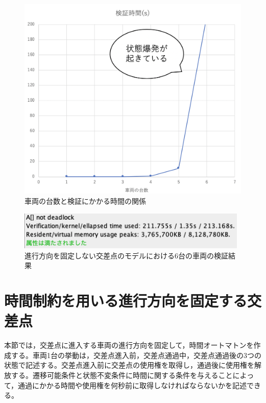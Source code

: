 \documentclass{tpu-sotu}
\begin{document}
	\begin{figure}[htbp]
	\centering
	\includegraphics[width=120mm]{IntersectionVerificationTime.png}
	\caption{車両の台数と検証にかかる時間の関係}
	\label{IVT}
	\end{figure}

	\begin{figure}[htbp]
	\centering
	\includegraphics[width=110mm]{InterBigCar6.png}
	\caption{進行方向を固定しない交差点のモデルにおける6台の車両の検証結果}
	\label{IBC6}
	\end{figure}

	
	\section{時間制約を用いる進行方向を固定する交差点}
	本節では，交差点に進入する車両の進行方向を固定して，時間オートマトン\cite{u3}を作成する。車両1台の挙動は，交差点進入前，交差点通過中，交差点通過後の3つの状態で記述する。交差点進入前に交差点の使用権を取得し，通過後に使用権を解放する。遷移可能条件と状態不変条件に時間に関する条件を与えることによって，通過にかかる時間や使用権を何秒前に取得しなければならないかを記述できる。
\end{document}
